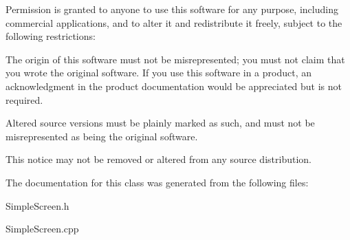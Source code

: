 Permission is granted to anyone to use this software for any purpose, including commercial applications, and to alter it and redistribute it freely, subject to the following restrictions\+:


\begin{DoxyEnumerate}
\item The origin of this software must not be misrepresented; you must not claim that you wrote the original software. If you use this software in a product, an acknowledgment in the product documentation would be appreciated but is not required.
\item Altered source versions must be plainly marked as such, and must not be misrepresented as being the original software.
\item This notice may not be removed or altered from any source distribution. 
\end{DoxyEnumerate}

The documentation for this class was generated from the following files\+:\begin{DoxyCompactItemize}
\item 
Simple\+Screen.\+h\item 
Simple\+Screen.\+cpp\end{DoxyCompactItemize}
